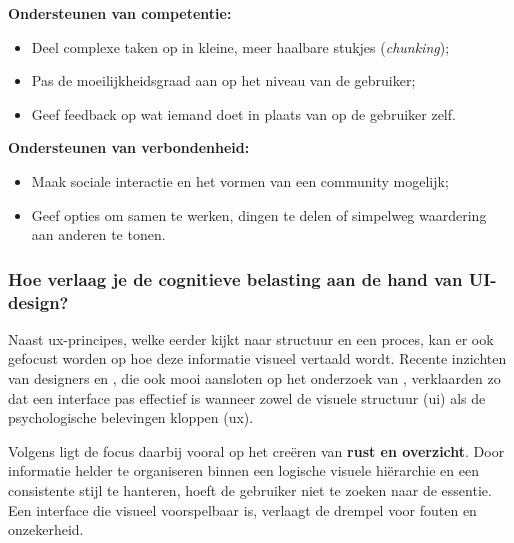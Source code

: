 \vspace{1em}

\textbf{Ondersteunen van competentie:}
\begin{itemize}
    \item Deel complexe taken op in kleine, meer haalbare stukjes (\textit{chunking});
    \item Pas de moeilijkheidsgraad aan op het niveau van de gebruiker;
    \item Geef feedback op wat iemand doet in plaats van op de gebruiker zelf.
\end{itemize}

\newpage

\textbf{Ondersteunen van verbondenheid:}
\begin{itemize}
    \item Maak sociale interactie en het vormen van een community mogelijk;
    \item Geef opties om samen te werken, dingen te delen of simpelweg waardering aan anderen te tonen.
\end{itemize}

\vspace{1em}

\subsubsection{Hoe verlaag je de cognitieve belasting aan de hand van UI-design?}
\label{subsubsec:cognitieve-belasting-ui}

\vspace{1em}

Naast \acrshort{ux}-principes, welke eerder kijkt naar structuur en een proces, kan er ook gefocust worden op hoe deze informatie visueel vertaald wordt. Recente inzichten van designers \textcite{thealien2025cognitiveload} en \textcite{anoda2024ux}, die ook mooi aansloten op het onderzoek van \textcite{Peters2022}, verklaarden zo dat een interface pas effectief is wanneer zowel de visuele structuur (\acrshort{ui}) als de psychologische belevingen kloppen (\acrshort{ux}).

\vspace{1em}

Volgens \textcite{thealien2025cognitiveload} ligt de focus daarbij vooral op het creëren van \textbf{rust en overzicht}. Door informatie helder te organiseren binnen een logische visuele hiërarchie en een consistente stijl te hanteren, hoeft de gebruiker niet te zoeken naar de essentie. Een interface die visueel voorspelbaar is, verlaagt de drempel voor fouten en onzekerheid.

